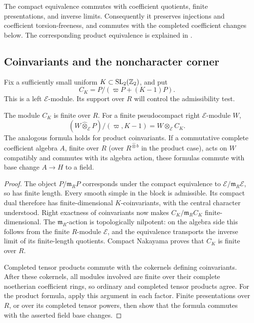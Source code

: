 The compact equivalence commutes with coefficient quotients, finite
presentations, and inverse limits. Consequently it preserves injections
and coefficient torsion-freeness, and commutes with the completed
coefficient changes below. The corresponding product equivalence is
explained in \cite[Proposition~4.2]{FM2}.

\subsection{Coinvariants and the noncharacter corner}

Fix a sufficiently small uniform \(K\subset\operatorname{SL}_2(\mathbb Z_2)\), and put
\[
 C_K=P/(\varpi P+(K-1)P).
\]
This is a left \(\mathcal E\)-module. Its support over \(R\) will control
the admissibility test.

\begin{lemma}\label{lem:coinvariant-finite}
The module \(C_K\) is finite over \(R\). For a finite pseudocompact
right \(\mathcal E\)-module \(W\),
\[
 (W\widehat\otimes_{\mathcal E}P)/(\varpi,K-1)
       =W\otimes_{\mathcal E}C_K.
\]
The analogous formula holds for product coinvariants. If a commutative
complete coefficient algebra $A$, finite over $R$ (over
$R^{\widehat\otimes b}$ in the product case), acts on $W$ compatibly
and commutes with its algebra action, these formulas commute with
base change $A\to H$ to a field.
\end{lemma}
\begin{proof}
The object \(P/\mathfrak m_RP\) corresponds under the compact
equivalence to \(\mathcal E/\mathfrak m_R\mathcal E\), so has finite
length. Every smooth simple in the block is admissible. Its compact
dual therefore has finite-dimensional \(K\)-coinvariants, with the
central character understood. Right exactness of coinvariants now
makes \(C_K/\mathfrak m_RC_K\) finite-dimensional. The
\(\mathfrak m_R\)-action is topologically nilpotent: on the algebra
side this follows from the finite \(R\)-module \(\mathcal E\), and the
equivalence transports the inverse limit of its finite-length
quotients. Compact Nakayama proves that \(C_K\) is finite over \(R\).

Completed tensor products commute with the cokernels defining
coinvariants. After these cokernels, all modules involved are finite
over their complete noetherian coefficient rings, so ordinary and
completed tensor products agree. For the product formula, apply this
argument in each factor. Finite presentations over \(R\), or over its
completed tensor powers, then show that the formula commutes with the
asserted field base changes.
\end{proof}

